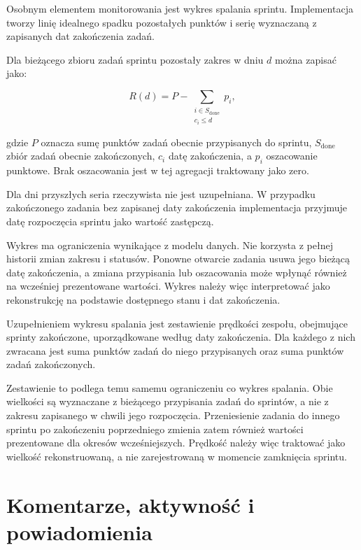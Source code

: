 Osobnym elementem monitorowania jest wykres spalania sprintu. Implementacja tworzy linię idealnego spadku pozostałych punktów i serię wyznaczaną z zapisanych dat zakończenia zadań.

Dla bieżącego zbioru zadań sprintu pozostały zakres w dniu \(d\) można zapisać jako:

\begin{equation}
    R(d) =
    P -
    \sum_{\substack{i \in S_{\mathrm{done}}\\c_i \leq d}} p_i,
    \label{eq:burndown-implementacja}
\end{equation}

gdzie \(P\) oznacza sumę punktów zadań obecnie przypisanych do sprintu, \(S_{\mathrm{done}}\) zbiór zadań obecnie zakończonych, \(c_i\) datę zakończenia, a \(p_i\) oszacowanie punktowe. Brak oszacowania jest w tej agregacji traktowany jako zero.

Dla dni przyszłych seria rzeczywista nie jest uzupełniana. W przypadku zakończonego zadania bez zapisanej daty zakończenia implementacja przyjmuje datę rozpoczęcia sprintu jako wartość zastępczą.

Wykres ma ograniczenia wynikające z modelu danych. Nie korzysta z pełnej historii zmian zakresu i statusów. Ponowne otwarcie zadania usuwa jego bieżącą datę zakończenia, a zmiana przypisania lub oszacowania może wpłynąć również na wcześniej prezentowane wartości. Wykres należy więc interpretować jako rekonstrukcję na podstawie dostępnego stanu i dat zakończenia.

Uzupełnieniem wykresu spalania jest zestawienie prędkości zespołu, obejmujące sprinty zakończone, uporządkowane według daty zakończenia. Dla każdego z nich zwracana jest suma punktów zadań do niego przypisanych oraz suma punktów zadań zakończonych.

Zestawienie to podlega temu samemu ograniczeniu co wykres spalania. Obie wielkości są wyznaczane z bieżącego przypisania zadań do sprintów, a nie z zakresu zapisanego w chwili jego rozpoczęcia. Przeniesienie zadania do innego sprintu po zakończeniu poprzedniego zmienia zatem również wartości prezentowane dla okresów wcześniejszych. Prędkość należy więc traktować jako wielkość rekonstruowaną, a nie zarejestrowaną w momencie zamknięcia sprintu.

\section{Komentarze, aktywność i powiadomienia}

